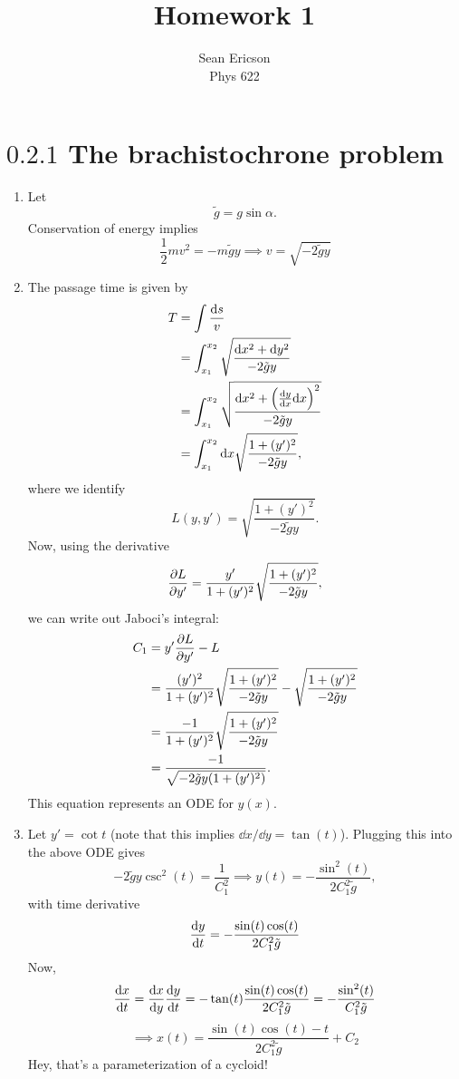 \documentclass[12pt]{article}
\begin{document}
\title{Homework 1}
\author{Sean Ericson \\ Phys 622}
\maketitle

\section*{$0.2.1$ The brachistochrone problem}
\begin{enumerate}[label=(\alph*)]
    \item Let
    \[ \tilde{g} = g\sin\alpha. \]
    Conservation of energy implies 
    \[ \frac{1}{2}mv^2 = -m\tilde{g}y \implies \boxed{v = \sqrt{-2\tilde{g}y}} \]

    \item The passage time is given by
    \begin{align*}
        T &= \int \frac{\dd s}{v} \\
        &= \int_{x_1}^{x_2}\sqrt{\frac{\dd x^2 + \dd y^2}{-2\tilde{g}y}} \\
        &= \int_{x_1}^{x_2}\sqrt{\frac{\dd x^2 + \left(\dv{y}{x} \dd x\right)^2}{-2\tilde{g}y}} \\
        &= \int_{x_1}^{x_2}\dd x \sqrt{\frac{1 + (y')^2}{-2\tilde{g}y}},
    \end{align*}
    where we identify
    \[ L(y, y') = \sqrt{\frac{1 + (y')^2}{-2\tilde{g}y}}. \]
    Now, using the derivative
    \[ \pdv{L}{y'} = \frac{y'}{1 + (y')^2}\sqrt{\frac{1 + (y')^2}{-2\tilde{g}y}}, \]
    we can write out Jaboci's integral:
    \begin{align*}
        C_1 &= y'\pdv{L}{y'} - L \\
        &= \frac{(y')^2}{1 + (y')^2}\sqrt{\frac{1 + (y')^2}{-2\tilde{g}y}} - \sqrt{\frac{1 + (y')^2}{-2\tilde{g}y}} \\
        &= \frac{-1}{1 + (y')^2}\sqrt{\frac{1 + (y')^2}{-2\tilde{g}y}} \\
        &= \frac{-1}{\sqrt{-2\tilde{g}y(1 + (y')^2)}}.
    \end{align*}
    This equation represents an ODE for $y(x)$.

    \item Let $y' = \cot t$ (note that this implies $\dd x/ \dd y = \tan(t)$). Plugging this into the above ODE gives
    \[ -2\tilde{g}y\csc^2(t) = \frac{1}{C_1^2} \implies \boxed{y(t) = -\frac{\sin^2(t)}{2C_1^2\tilde{g}}}, \]
    with time derivative
    \[ \dv{y}{t} = -\frac{\sin(t)\cos(t)}{2C_1^2\tilde{g}} \]
    Now, 
    \[ \dv{x}{t} = \dv{x}{y}\dv{y}{t} = -\tan(t)\frac{\sin(t)\cos(t)}{2C_1^2\tilde{g}} = -\frac{\sin^2(t)}{C_1^2\tilde{g}} \]
    \[ \implies \boxed{x(t) = \frac{\sin(t)\cos(t) - t}{2C_1^2\tilde{g}} + C_2} \]
    Hey, that's a parameterization of a cycloid!


\end{enumerate}
\end{document}
